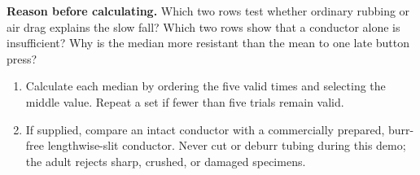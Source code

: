{\textbf{Reason before calculating.}\quad
Which two rows test whether ordinary rubbing or air drag explains the slow
fall? Which two rows show that a conductor alone is insufficient? Why is the
median more resistant than the mean to one late button press?

\begin{enumerate}[resume]
\item Calculate each median by ordering the five valid times and selecting the
middle value. Repeat a set if fewer than five trials remain valid.
\item If supplied, compare an intact conductor with a commercially prepared,
burr-free lengthwise-slit conductor. Never cut or deburr tubing during this
demo; the adult rejects sharp, crushed, or damaged specimens.
\end{enumerate}
}
\def\explanation{%
Changing magnetic flux drives circulating currents in the tube wall. By Lenz's
law their magnetic effect opposes the change that produced them, so the falling
magnet experiences an upward braking force. Gravity still transfers energy:
the magnet's lost gravitational potential energy becomes mainly thermal energy
in the conductor, with smaller sound and motion losses. The metal need not be
ferromagnetic. A nonmagnetic slug supplies the drag control; a nonconducting
tube supplies the magnetic control. A lengthwise slit interrupts the broad
closed current paths and therefore weakens the braking.

}
